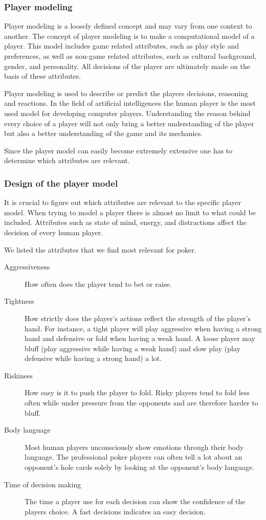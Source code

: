 \subsubsection{Player modeling}
\label{sec:pm}
Player modeling is a loosely defined concept and may vary from one context to another. The concept of player modeling is to make a computational model of a player. This model includes game related attributes, such as play style and preferences, as well as non-game related attributes, such as cultural background, gender, and personality. All decisions of the player are ultimately made on the basis of these attributes. 

Player modeling is used to describe or predict the players decisions, reasoning and reactions. In the field of artificial intelligences the human player is the most used model for developing computer players. Understanding the reason behind every choice of a player will not only bring a better understanding of the player but also a better understanding of the game and its mechanics.

Since the player model can easily become extremely extensive one has to determine which attributes are relevant.

\subsubsection{Design of the player model}
It is crucial to figure out which attributes are relevant to the specific player model. When trying to model a player there is almost no limit to what could be included. Attributes such as state of mind, energy, and distractions affect the decision of every human player.  

We listed the attributes that we find most relevant for poker.

\begin{description}
\item[Aggressiveness] How often does the player tend to bet or raise.
\item[Tightness] How strictly does the player's actions reflect the strength of the player's hand. For instance, a tight player will play aggressive when having a strong hand and defensive or fold when having a weak hand. A loose player may bluff (play aggressive while having a weak hand) and slow play (play defensive while having a strong hand) a lot.
\item[Riskiness] How easy is it to push the player to fold. Risky players tend to fold less often while under pressure from the opponents and are therefore harder to bluff.
\item[Body language] Most human players unconsciously show emotions through their body language. The professional poker players can often tell a lot about an opponent's hole cards solely by looking at the opponent's body language.
\item[Time of decision making] The time a player use for each decision can show the confidence of the players choice. A fast decisions indicates an easy decision. 
\end{description}

